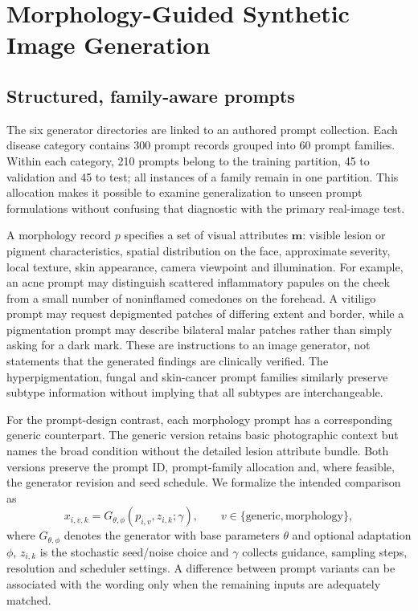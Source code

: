\section{Morphology-Guided Synthetic Image Generation}
\subsection{Structured, family-aware prompts}
The six generator directories are linked to an authored prompt collection. Each disease category contains 300 prompt records grouped into 60 prompt families. Within each category, 210 prompts belong to the training partition, 45 to validation and 45 to test; all instances of a family remain in one partition. This allocation makes it possible to examine generalization to unseen prompt formulations without confusing that diagnostic with the primary real-image test.

A morphology record $p$ specifies a set of visual attributes $\mathbf{m}$: visible lesion or pigment characteristics, spatial distribution on the face, approximate severity, local texture, skin appearance, camera viewpoint and illumination. For example, an acne prompt may distinguish scattered inflammatory papules on the cheek from a small number of noninflamed comedones on the forehead. A vitiligo prompt may request depigmented patches of differing extent and border, while a pigmentation prompt may describe bilateral malar patches rather than simply asking for a dark mark. These are instructions to an image generator, not statements that the generated findings are clinically verified. The hyperpigmentation, fungal and skin-cancer prompt families similarly preserve subtype information without implying that all subtypes are interchangeable.

For the prompt-design contrast, each morphology prompt has a corresponding generic counterpart. The generic version retains basic photographic context but names the broad condition without the detailed lesion attribute bundle. Both versions preserve the prompt ID, prompt-family allocation and, where feasible, the generator revision and seed schedule. We formalize the intended comparison as
\begin{equation}
x_{i,v,k}=G_{\theta,\phi}(p_{i,v},z_{i,k};\gamma),
\qquad v\in\{\mathrm{generic},\mathrm{morphology}\},
\label{eq:generator}
\end{equation}
where $G_{\theta,\phi}$ denotes the generator with base parameters $\theta$ and optional adaptation $\phi$, $z_{i,k}$ is the stochastic seed/noise choice and $\gamma$ collects guidance, sampling steps, resolution and scheduler settings. A difference between prompt variants can be associated with the wording only when the remaining inputs are adequately matched.

